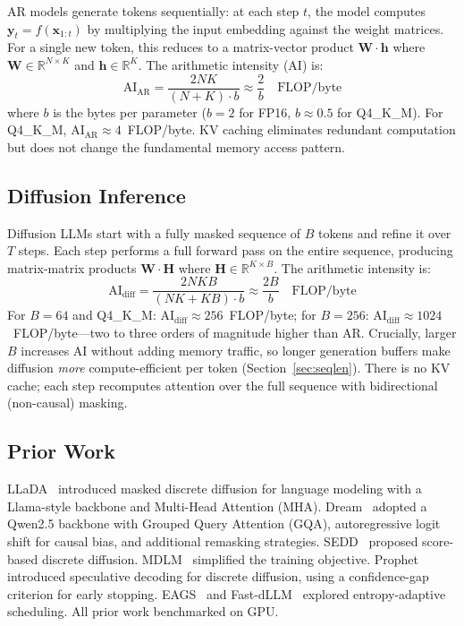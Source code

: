 \documentclass[11pt]{article}
\begin{document}
AR models generate tokens sequentially: at each step $t$, the model computes
$\mathbf{y}_t = f(\mathbf{x}_{1:t})$ by multiplying the input embedding against the
weight matrices. For a single new token, this reduces to a matrix-vector product
$\mathbf{W} \cdot \mathbf{h}$ where $\mathbf{W} \in \mathbb{R}^{N \times K}$ and
$\mathbf{h} \in \mathbb{R}^{K}$. The arithmetic intensity (AI) is:
\begin{equation}
\text{AI}_{\text{AR}} = \frac{2NK}{(N+K) \cdot b} \approx \frac{2}{b} \quad \text{FLOP/byte}
\end{equation}
where $b$ is the bytes per parameter ($b=2$ for FP16, $b \approx 0.5$ for Q4\_K\_M).
For Q4\_K\_M, $\text{AI}_{\text{AR}} \approx 4$~FLOP/byte. KV caching eliminates
redundant computation but does not change the fundamental memory access pattern.

\subsection{Diffusion Inference}

Diffusion LLMs start with a fully masked sequence of $B$ tokens and refine it over $T$
steps. Each step performs a full forward pass on the entire sequence, producing
matrix-matrix products $\mathbf{W} \cdot \mathbf{H}$ where
$\mathbf{H} \in \mathbb{R}^{K \times B}$. The arithmetic intensity is:
\begin{equation}
\text{AI}_{\text{diff}} = \frac{2NKB}{(NK + KB) \cdot b} \approx \frac{2B}{b} \quad \text{FLOP/byte}
\end{equation}
For $B=64$ and Q4\_K\_M: $\text{AI}_{\text{diff}} \approx 256$~FLOP/byte; for $B=256$:
$\text{AI}_{\text{diff}} \approx 1024$~FLOP/byte---two to three orders of magnitude higher
than AR. Crucially, larger $B$ increases AI without adding memory traffic, so longer
generation buffers make diffusion \emph{more} compute-efficient per token (Section~\ref{sec:seqlen}).
There is no KV cache; each step recomputes attention over the full sequence with
bidirectional (non-causal) masking.

\subsection{Prior Work}

LLaDA~\cite{nie2025} introduced masked discrete diffusion for language modeling with a
Llama-style backbone and Multi-Head Attention (MHA). Dream~\cite{ye2025} adopted a
Qwen2.5 backbone with Grouped Query Attention (GQA), autoregressive logit shift for
causal bias, and additional remasking strategies. SEDD~\cite{lou2024} proposed
score-based discrete diffusion. MDLM~\cite{sahoo2024} simplified the training objective.
Prophet~\cite{li2025} introduced speculative decoding for discrete diffusion, using a
confidence-gap criterion for early stopping. EAGS~\cite{koh2024} and
Fast-dLLM~\cite{wu2025} explored entropy-adaptive scheduling. All prior work
benchmarked on GPU.
\end{document}
